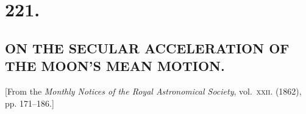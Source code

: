 \documentclass[11pt,a4paper]{article}
\begin{document}

\section*{\large 221.}
\subsection*{ON THE SECULAR ACCELERATION OF THE MOON'S MEAN MOTION.}

\begin{center}
[From the \textit{Monthly Notices of the Royal Astronomical Society}, vol.~\textsc{xxii}. (1862), pp. 171--186.]
\end{center}

\medskip
\end{document}
